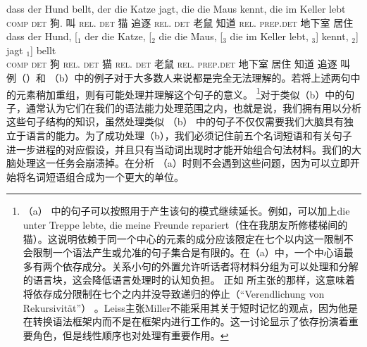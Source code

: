 \ex 
\gll dass der Hund bellt, der die Katze jagt, die die Maus kennt, die im Keller lebt\\
    \textsc{comp} \textsc{det} 狗.\mas{} 叫 \textsc{rel}.\mas{} \textsc{det} 猫 追逐 \textsc{rel}.\fem{} \textsc{det} 老鼠 知道 \textsc{rel}.\fem{} \textsc{prep}.\textsc{det} 地下室 居住\\
\ex\label{Bsp-Selbsteinbettung} 
\gll dass          der          Hund, [$_1$ der                 die       Katze, [$_2$ die                 die         Maus, [$_3$ die                 im                          Keller lebt,  $_3$] kennt, $_2$] jagt $_1$] bellt\\
     \textsc{comp} \textsc{det} 狗     {}   \textsc{rel}.\mas{} \textsc{det} 猫 {}     \textsc{rel}.\fem{} \textsc{det} 老鼠   {}   \textsc{rel}.\fem{} \textsc{prep}.\textsc{det} 地下室 居住 {} 知道 {} 追逐 {} 叫\\
\zl
%
例（）和 （b）中的例子对于大多数人来说都是完全无法理解的。若将上述两句中的元素稍加重组，则有可能处理并理解这个句子的意义。 \footnote{%
 （a） 中的句子可以按照用于产生该句的模式继续延长。例如，可以加上die unter Treppe lebte, die meine Freunde repariert（住在我朋友所修楼梯间的猫）。这说明依赖于同一个中心的元素的成分应该限定在七个以内这一限制\citep[]{Leiss2003a}不会限制一个语法产生或允准的句子集合是有限的。在（a）中，一个中心语最多有两个依存成分。关系小句的外置允许听话者将材料分组为可以处理和分解的语言块，这会降低语言处理时的认知负担。  
正如 \citet[]{Leiss2003a}所主张的那样，这意味着将依存成分限制在七个之内并没导致递归的停止（``Ver\-end\-lichung von Rekursivität''） 。Leiss主张Miller不能采用其关于短时记忆的观点，因为他是在转换语法框架内而不是在\dgc 框架内进行工作的。这一讨论显示了依存扮演着重要角色，但是线性顺序也对处理有重要作用。
}对于类似（b）中的句子，通常认为它们在我们的语法能力处理范围之内，也就是说，我们拥有用以分析这些句子结构的知识，虽然处理类似 （b） 中的句子不仅仅需要我们大脑具有独立于语言的能力。为了成功处理（b），我们必须记住前五个名词短语和有关句子进一步进程的对应假设，并且只有当动词出现时才能开始组合句法材料。我们的大脑处理这一任务会崩溃掉。在分析 （a）时则不会遇到这些问题，因为可以立即开始将名词短语组合成为一个更大的单位。
